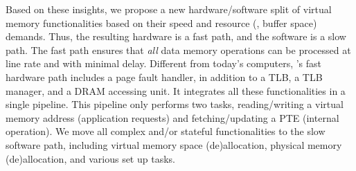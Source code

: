 Based on these insights, we propose a new hardware/software split of virtual memory functionalities
based on their speed and resource (\eg, buffer space) demands.
Thus, the resulting hardware is a fast path, and the software is a slow path.
The fast path ensures that {\em all} data memory operations can be processed at line rate and with minimal delay.
Different from today's computers, \sys's fast hardware path includes a page fault handler, in addition to a TLB, a TLB manager, and a DRAM accessing unit.
It integrates all these functionalities in a single pipeline.   
This pipeline only performs two tasks, reading/writing a virtual memory address (application requests)
and fetching/updating a PTE (internal operation).
We move all complex and/or stateful functionalities to the slow software path,
including virtual memory space (de)allocation, physical memory (de)allocation,
and various set up tasks. 


